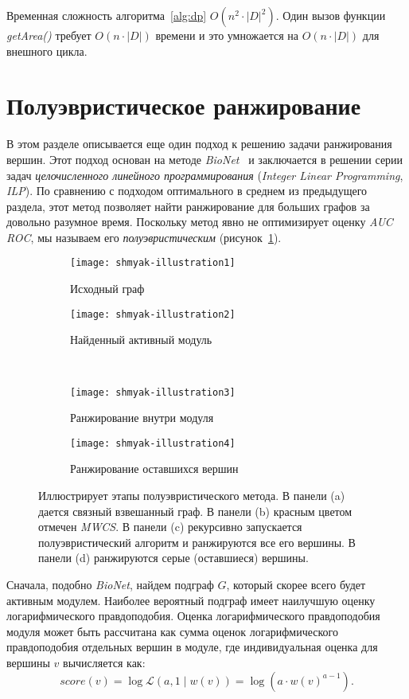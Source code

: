 Временная сложность алгоритма~\ref{alg:dp} $O(n^2 \cdot |D|^2)$.  Один вызов
функции \emph{getArea()} требует $O(n \cdot |D|)$ времени и это умножается на
$O(n \cdot |D|)$ для внешного цикла. 





\section{Полуэвристическое ранжирование}
\label{sec_semiheuristic}

В этом разделе описывается еще один подход к решению задачи ранжирования
вершин.  Этот подход основан на методе \emph{BioNet}~\cite{Dittrich2008a}
и заключается в решении серии задач \emph{целочисленного линейного
программирования} (\emph{Integer Linear Programming}, \emph{ILP}). По сравнению
с подходом оптимального в среднем из предыдущего раздела, этот метод позволяет
найти ранжирование для больших графов за довольно разумное время.  Поскольку
метод явно не оптимизирует оценку \emph{AUC ROC}, мы называем его
\emph{полуэвристическим} (рисунок~\ref{fig:shranking}).
\begin{figure}
    \begin{subfigure}{.5\textwidth}
        \centering
        \texttt{[image: shmyak-illustration1]}
        \caption{Исходный граф} 
    \end{subfigure}%
    \begin{subfigure}{.5\textwidth}
        \centering
        \texttt{[image: shmyak-illustration2]}
        \caption{Найденный активный модуль}
    \end{subfigure}\\[1ex]
    \begin{subfigure}{.5\textwidth}
        \centering
        \texttt{[image: shmyak-illustration3]}
        \caption{Ранжирование внутри модуля}
    \end{subfigure}%
    \begin{subfigure}{.5\textwidth}
        \centering
        \texttt{[image: shmyak-illustration4]}
        \caption{Ранжирование оставшихся вершин}
    \end{subfigure}
    \centering
    \caption{
        Иллюстрирует этапы полуэвристического метода.  В панели (a) дается
        связный взвешанный граф.  В панели (b) красным цветом отмечен \emph{MWCS}.
        В панели (c) рекурсивно запускается полуэвристический алгоритм
        и ранжируются все его вершины.  В панели (d) ранжируются серые
        (оставшиеся) вершины.
    }%
    \label{fig:shranking}%
\end{figure}
Сначала, подобно \emph{BioNet}, найдем подграф $G$, который скорее всего будет
активным модулем.  Наиболее вероятный подграф имеет наилучшую оценку
логарифмического правдоподобия.  Оценка логарифмического правдоподобия модуля
может быть рассчитана как сумма оценок логарифмического правдоподобия отдельных
вершин в модуле, где индивидуальная оценка для вершины $v$ вычисляется как: \[
    score(v) = \log \mathcal{L} (a, 1 \mid w(v)) = \log(a \cdot {w(v)}^{a - 1}).\]


